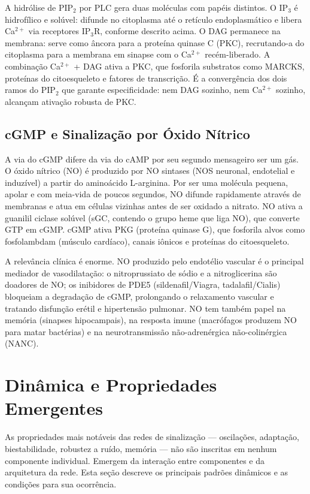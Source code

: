 A hidrólise de PIP$_2$ por PLC gera duas moléculas com papéis distintos. O
IP$_3$ é hidrofílico e solúvel: difunde no citoplasma até o retículo
endoplasmático e libera Ca$^{2+}$ via receptores IP$_3$R, conforme descrito
acima. O DAG permanece na membrana: serve como âncora para a proteína
quinase C (PKC), recrutando-a do citoplasma para a membrana em sinapse
com o Ca$^{2+}$ recém-liberado. A combinação Ca$^{2+}$ + DAG ativa a PKC,
que fosforila substratos como MARCKS, proteínas do citoesqueleto e
fatores de transcrição. É a convergência dos dois ramos do PIP$_2$ que
garante especificidade: nem DAG sozinho, nem Ca$^{2+}$ sozinho, alcançam
ativação robusta de PKC.

\subsection{cGMP e Sinalização por Óxido Nítrico}
\label{subfigure:09-cgmp}

A via do cGMP difere da via do cAMP por seu segundo mensageiro ser um gás.
O óxido nítrico (NO) é produzido por NO sintases (NOS neuronal, endotelial
e induzível) a partir do aminoácido L-arginina. Por ser uma molécula
pequena, apolar e com meia-vida de poucos segundos, NO difunde rapidamente
através de membranas e atua em células vizinhas antes de ser oxidado a
nitrato. NO ativa a guanilil ciclase solúvel (sGC, contendo o grupo heme
que liga NO), que converte GTP em cGMP. cGMP ativa PKG (proteína quinase G),
que fosforila alvos como fosfolambdam (músculo cardíaco), canais iônicos
e proteínas do citoesqueleto.

A relevância clínica é enorme. NO produzido pelo endotélio vascular é o
principal mediador de vasodilatação: o nitroprussiato de sódio e a nitroglicerina
são doadores de NO; os inibidores de PDE5 (sildenafil/Viagra, tadalafil/Cialis)
bloqueiam a degradação de cGMP, prolongando o relaxamento vascular e tratando
disfunção erétil e hipertensão pulmonar. NO tem também papel na memória
(sinapses hipocampais), na resposta imune (macrófagos produzem NO para matar
bactérias) e na neurotransmissão não-adrenérgica não-colinérgica (NANC).


\section{Dinâmica e Propriedades Emergentes}
\label{sec:09-dinamica}

As propriedades mais notáveis das redes de sinalização --- oscilações,
adaptação, biestabilidade, robustez a ruído, memória --- não são inscritas em
nenhum componente individual. Emergem da interação entre componentes e da
arquitetura da rede. Esta seção descreve os principais padrões dinâmicos e as
condições para sua ocorrência.


